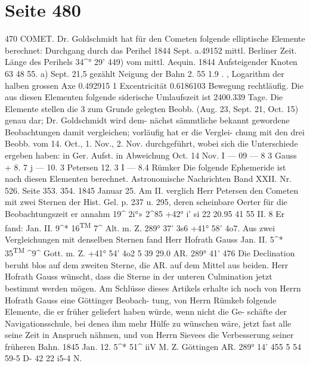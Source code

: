 \documentclass[10pt,a4paper]{article}
\begin{document}
\newpage
\section*{Seite 480}

470  COMET.
Dr.  Goldschmidt  hat  für  den  Cometen  folgende  elliptische  Elemente  berechnet:
Durchgang  durch  das  Perihel  1844  Sept.  a.49152  mittl.  Berliner  Zeit.
Länge  des  Perihels
34\textasciicircum{}°  29'    44\glqq{}9)    vom  mittl.  Aequin.  1844
Aufsteigender  Knoten
63     48     55.  a)    Sept.  21,5  gezählt
Neigung  der  Bahn                2.    55       1.9  \textbullet{}        .         ,
Logarithm  der  halben  grossen  Axe  0.492915 1
Excentricität
0.6186103
Bewegung  rechtläufig.
Die  aus  diesen  Elementen  folgende  siderische  Umlaufszeit  ist  2400.339  Tage.  Die  Elemente  stellen
die  3  zum  Grunde  gelegten  Beobb.  (Aug.  23,  Sept.  21,  Oct.  15)  genau  dar;  Dr.  Goldschmidt  wird  dem-
nächst sämmtliche  bekannt  gewordene  Beobachtungen  damit  vergleichen;  vorläufig  hat  er  die  Verglei-
chung  mit  den  drei  Beobb.  vom  14.  Oct.,  1.  Nov.,  2.  Nov.  durchgeführt,  wobei  sich  die  Unterschiede
ergeben  haben:
in  Ger.  Aufst.      in  Abweichung
Oct.    14
Nov.     I
---  09
---    8  \glqq{}3  Gauss
+    8.  7       j     ---  10.  3  Petersen
12. 3       I     ---    8.4  Rümker
Die  folgende  Ephemeride  ist  nach  diesen  Elementen  berechnet.
Astronomische  Nachrichten  Band  XXII.  Nr.  526.  Seite  353.  354.     1845  Januar  25.
Am  II.  verglich  Herr  Petersen  den  Cometen  mit  zwei  Sternen  der  Hist.  Gel.  p.  237  u.  295,  deren
scheinbare  Oerter  für  die  Beobachtungszeit  er  annahm
19\textasciicircum{}  2i°»    2\textasciicircum{}85         +42°     i'     s\glqq{}i
22     20.95  41     55     II.  8
Er  fand:
Jan.  II.     9\textasciicircum{}*  16\textsuperscript{TM}  7\textasciicircum{}  Alt.  m.  Z.        289°  37'  3s\glqq{}6         +41°  58'  4o\glqq{}7.
Aus  zwei  Vergleichungen  mit  denselben  Sternen  fand  Herr  Hofrath  Gauss
Jan.  II.     5\textasciicircum{}*  35\textsuperscript{TM}  \textasciicircum{}9\glqq{}\textasciicircum{}  Gott.  m.  Z.  +41°  54'  4o\glqq{}2
5     39     29.0  AR.  289°  41'  47\glqq{}6
Die  Declination  beruht  blos  auf  dem  zweiten  Sterne,  die  AR.  auf  dem  Mittel  aus  beiden.  Herr
Hofrath  Gauss  wünscht,  dass  die  Sterne  in  der  unteren  Culmination  jetzt  bestimmt  werden  mögen.
Am  Schlüsse  dieses  Artikels  erhalte  ich  noch  von  Herrn  Hofrath  Gauss  eine  Göttinger  Beobach-
tung, von  Herrn  Rümkeb  folgende  Elemente,  die  er  früher  geliefert  haben  würde,  wenn  nicht  die  Ge-
schäfte der  Navigationsschule,  bei  denea  ihm  mehr  Hülfe  zu  wünschen  wäre,  jetzt  fast  alle  seine  Zeit
in  Anspruch  nähmen,  und  von  Herrn  Sievees  die  Verbesserung  seiner  früheren  Bahn.
1845  Jan.  12.    5\textasciicircum{}*  51\glqq{}\textasciicircum{}  iiV  M.  Z.  Göttingen        AR.  289°  14'  45\glqq{}5
5     54     59-5  D-       42     22     i5-4  N.
\end{document}
